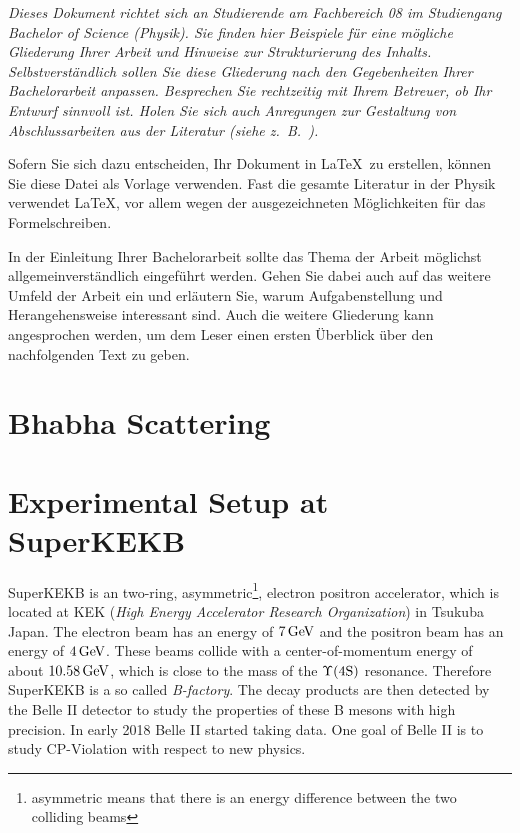 \documentclass[a4paper,11pt,oneside,final,german,openbib,pdftex]{scrbook}
\begin{document}
{\em Dieses Dokument richtet sich an Studierende am Fachbereich 08 im 
Studiengang Bachelor of Science (Physik). Sie finden hier Beispiele 
f\"ur eine m\"ogliche Gliederung Ihrer Arbeit und Hinweise zur 
Strukturierung des Inhalts. Selbstverst\"andlich sollen Sie diese 
Gliederung nach den Gegebenheiten Ihrer Bachelorarbeit anpassen. 
Besprechen Sie rechtzeitig mit Ihrem Betreuer, ob Ihr Entwurf sinnvoll 
ist. Holen Sie sich auch Anregungen zur Gestaltung von Abschlussarbeiten 
aus der Literatur (siehe z.\ B.\ \cite{EbelBliefert}).
\medskip

Sofern Sie sich dazu entscheiden, Ihr Dokument in \LaTeX\ zu erstellen, 
k\"onnen Sie diese Datei als Vorlage verwenden. Fast die gesamte 
Literatur in der Physik verwendet \LaTeX, vor allem wegen der 
ausgezeichneten M\"oglichkeiten f\"ur das Formelschreiben.
}
\bigskip

In der Einleitung Ihrer Bachelorarbeit sollte das Thema der Arbeit 
m\"oglichst allgemeinverst\"andlich eingef\"uhrt werden. Gehen Sie 
dabei auch auf das weitere Umfeld der Arbeit ein und erl\"autern Sie, 
warum Aufgabenstellung und Herangehensweise interessant sind. Auch 
die weitere Gliederung kann angesprochen werden, um dem Leser einen 
ersten \"Uberblick \"uber den nachfolgenden Text zu geben.

\chapter{Bhabha Scattering}



\chapter{Experimental Setup at SuperKEKB}
\label{sec:SetupKEK}

SuperKEKB is an two-ring, asymmetric\footnote{asymmetric means that there is an energy difference between the two colliding beams}, electron positron accelerator, which is located at KEK (\textit{High Energy Accelerator Research Organization}) in Tsukuba Japan. 
The electron beam has an energy of $7\,\textnormal{GeV}$ 
and the positron beam has an energy of $4\,\textnormal{GeV}$. These beams collide with a center-of-momentum energy of about $10.58\,\textnormal{GeV}$, which is close to the mass of the $\Upsilon(4\textnormal{S})$ resonance. Therefore SuperKEKB is a so called \textit{B-factory}. The decay products are then detected by the  Belle II detector to study the properties of these B mesons with high precision. In early 2018 Belle II started taking data. One goal of Belle II is to study CP-Violation with respect to new physics.
\end{document}
